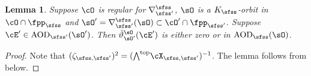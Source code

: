 \documentclass[12pt,a4paper]{amsart}
\numberwithin{equation}{section}
\newtheorem{lem}[thm]{Lemma}
\theoremstyle{remark}
\def\cOp{\cO^{\prime}}
\begin{document}
\def\wedgetop{{\bigwedge}^{\mathrm{top}}}


\medskip

\def\dlift{{\check\vartheta}}
\def\AOD{\mathrm{AOD}}

\begin{lem}\label{lem:aod}
  Suppose $\cO$ is regular for $\DDss$, $\sO$ is a $\Ks$-orbit in $\cO\cap \fpps$ and
  $\sOp = \DDss(\sO)\subset \cOp\cap \fppsp$.
  Suppose $\cE' \in \AOD_{\sfss'}(\sOp)$.
  Then $\dlift_{\sO'}^{\sO}(\cE')$ is either zero or in $\AOD_{\sfss}(\sO)$.
\end{lem}
\begin{proof}
  Note that $(\zeta_{\sfss,\sfss'})^{2} = (\wedgetop \CXss)^{-1}$.
   The lemma follows from  below.
\end{proof}
\end{document}

